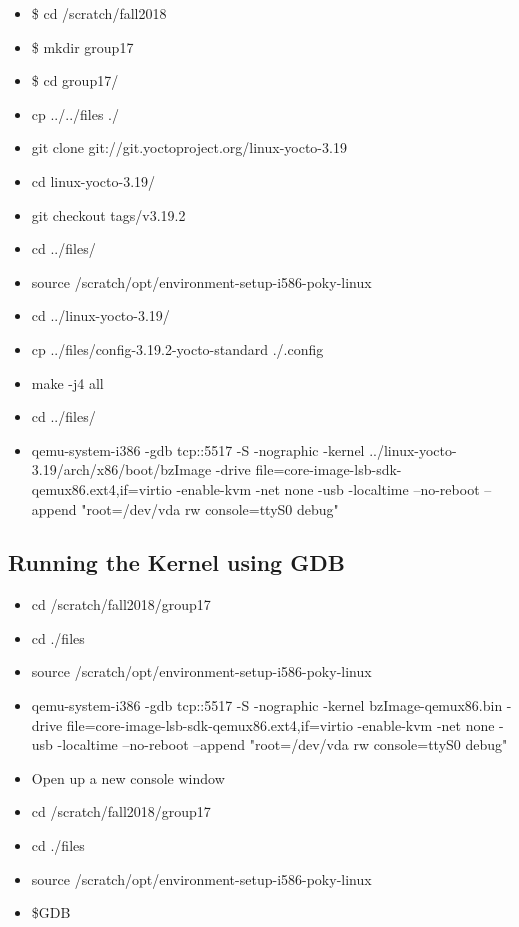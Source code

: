 \documentclass[10pt,a4paper,english]{article}
\begin{document}
\begin{itemize}
    \item \$ cd /scratch/fall2018
    \item \$ mkdir group17
    \item \$ cd group17/
    \item cp ../../files ./
    \item git clone git://git.yoctoproject.org/linux-yocto-3.19
\item cd linux-yocto-3.19/
\item git checkout tags/v3.19.2
\item cd ../files/
\item source /scratch/opt/environment-setup-i586-poky-linux
\item cd ../linux-yocto-3.19/
\item cp ../files/config-3.19.2-yocto-standard ./.config
\item make -j4 all
\item cd ../files/
\item qemu-system-i386 -gdb tcp::5517 -S -nographic -kernel ../linux-yocto-3.19/arch/x86/boot/bzImage -drive file=core-image-lsb-sdk-qemux86.ext4,if=virtio -enable-kvm -net none -usb -localtime --no-reboot --append "root=/dev/vda rw console=ttyS0 debug"
\end{itemize}

\subsection{Running the Kernel using GDB}

\begin{itemize}
\item cd /scratch/fall2018/group17
\item cd ./files
\item source /scratch/opt/environment-setup-i586-poky-linux
\item qemu-system-i386 -gdb tcp::5517 -S -nographic -kernel bzImage-qemux86.bin -drive file=core-image-lsb-sdk-qemux86.ext4,if=virtio -enable-kvm -net none -usb -localtime --no-reboot --append "root=/dev/vda rw console=ttyS0 debug"
\item Open up a new console window
\item cd /scratch/fall2018/group17
\item cd ./files
\item source /scratch/opt/environment-setup-i586-poky-linux
\item \$GDB
\end{itemize}
\end{document}
